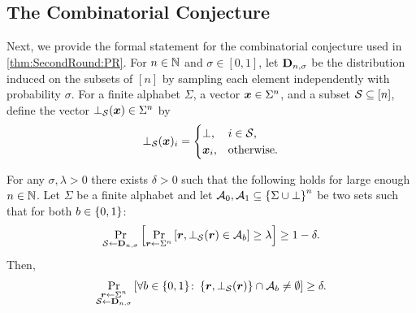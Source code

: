 

\subsection{The Combinatorial Conjecture}\label{sec:Iso}
Next, we provide the formal statement for the combinatorial conjecture used in \cref{thm:SecondRound:PR}.
For $n\in {\mathbb{N}}$ and $\sigma \in [0,1]$, let $\mathbf{D}_{n,\sigma}$ be the distribution induced on the subsets of $[n]$ by sampling each element independently with probability $\sigma$.
For a finite alphabet $\Sigma$, a vector ${ \boldsymbol{x}}\in \Sigma^n$, and a subset $\mathcal{S} \subseteq [n]$, define the vector $\bot_{\mathcal{S}}({ \boldsymbol{x}}) \in \Sigma^n$ by
\[
\bot_{\mathcal{S}}({ \boldsymbol{x}})_i=
\begin{cases}
\bot, & i\in {\cal{S}},\\
{ \boldsymbol{x}}_i, & \text{otherwise}.
\end{cases}
\]

\begin{conjecture}\label{con:IsoBot}
For any $\sigma,\lambda >0$ there exists $\delta>0$ such that the following holds for large enough $n\in {\mathbb{N}}$. Let  $\Sigma$ be a finite alphabet and let $\mathcal{A}_0,\mathcal{A}_1 \subseteq \left\{\Sigma \cup \bot\right\}^n$  be  two  sets such that for both $b\in \{0,1\}$:
\begin{align*}
\Pr_{{\cal{S}}\gets \mathbf{D}_{n,\sigma}}\left[\Pr_{{ \boldsymbol{r}} \gets \Sigma^n}\left[{ \boldsymbol{r}},\bot_{\mathcal{S}}({ \boldsymbol{r}}) \in \mathcal{A}_b\right] \ge  \lambda \right] \ge 1-\delta.
\end{align*}
Then,
\begin{align*}
\Pr_{\substack{{ \boldsymbol{r}}\gets \Sigma^n\\ \mathcal{S} \gets \mathbf{D}_{n,\sigma}}}\left[\forall b\in \{0,1\}\colon  \left\{{ \boldsymbol{r}},\bot_{\mathcal{S}}({ \boldsymbol{r}})\right\}  \cap \mathcal{A}_b \neq \emptyset\right] \ge  \delta.
\end{align*}
\end{conjecture}

